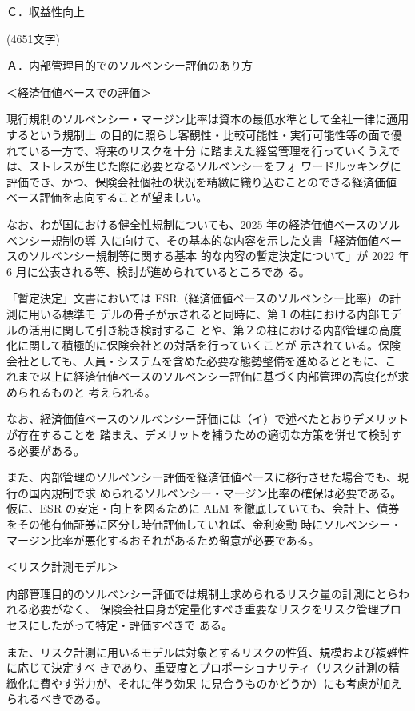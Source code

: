 \documentclass[report,gutter=10mm,fore-edge=10mm,uplatex,dvipdfmx]{jlreq}
\begin{document}
Ｃ．収益性向上

\answer{}
(4651文字)

Ａ．内部管理目的でのソルベンシー評価のあり方

＜経済価値ベースでの評価＞

 現行規制のソルベンシー・マージン比率は資本の最低水準として全社一律に適用するという規制上
の目的に照らし客観性・比較可能性・実行可能性等の面で優れている一方で、将来のリスクを十分
に踏まえた経営管理を行っていくうえでは、ストレスが生じた際に必要となるソルベンシーをフォ
ワードルッキングに評価でき、かつ、保険会社個社の状況を精緻に織り込むことのできる経済価値
ベース評価を志向することが望ましい。

 なお、わが国における健全性規制についても、2025 年の経済価値ベースのソルベンシー規制の導
入に向けて、その基本的な内容を示した文書「経済価値ベースのソルベンシー規制等に関する基本
的な内容の暫定決定について」が 2022 年 6 月に公表される等、検討が進められているところであ
る。

 「暫定決定」文書においては ESR（経済価値ベースのソルベンシー比率）の計測に用いる標準モ
デルの骨子が示されると同時に、第１の柱における内部モデルの活用に関して引き続き検討するこ
とや、第２の柱における内部管理の高度化に関して積極的に保険会社との対話を行っていくことが
示されている。保険会社としても、人員・システムを含めた必要な態勢整備を進めるとともに、こ
れまで以上に経済価値ベースのソルベンシー評価に基づく内部管理の高度化が求められるものと
考えられる。

 なお、経済価値ベースのソルベンシー評価には（イ）で述べたとおりデメリットが存在することを
踏まえ、デメリットを補うための適切な方策を併せて検討する必要がある。

 また、内部管理のソルベンシー評価を経済価値ベースに移行させた場合でも、現行の国内規制で求
められるソルベンシー・マージン比率の確保は必要である。仮に、ESR の安定・向上を図るために
ALM を徹底していても、会計上、債券をその他有価証券に区分し時価評価していれば、金利変動
時にソルベンシー・マージン比率が悪化するおそれがあるため留意が必要である。

＜リスク計測モデル＞

 内部管理目的のソルベンシー評価では規制上求められるリスク量の計測にとらわれる必要がなく、
保険会社自身が定量化すべき重要なリスクをリスク管理プロセスにしたがって特定・評価すべきで
ある。

 また、リスク計測に用いるモデルは対象とするリスクの性質、規模および複雑性に応じて決定すべ
きであり、重要度とプロポーショナリティ（リスク計測の精緻化に費やす労力が、それに伴う効果
に見合うものかどうか）にも考慮が加えられるべきである。
\end{document}
